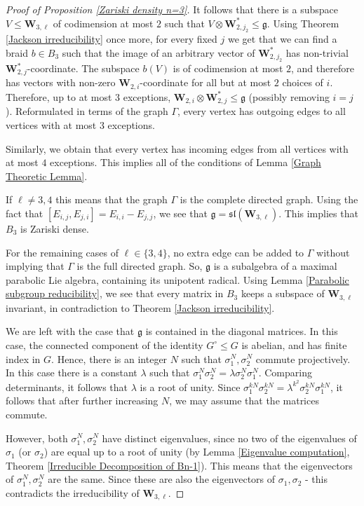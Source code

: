 \documentclass[letterpaper]{amsart}
\begin{document}
\begin{proof}[Proof of Proposition \ref{Zariski density n=3}]
    It follows that there is a subspace $V \leq \textbf{W}_{3, \ell}$ of codimension at most $2$ such that $V \otimes \textbf{W}_{2, j_2}^\ast \leq \mathfrak{g}$. Using Theorem \ref{Jackson irreducibility} once more, for every fixed $j$ we get that we can find a braid $b \in B_3$ such that the image of an arbitrary vector of $\textbf{W}_{2, j_2}^\ast$ has non-trivial $\textbf{W}_{2, j}^\ast$-coordinate. The subspace $b(V)$ is of codimension at most $2$, and therefore has vectors with non-zero $\textbf{W}_{2, i}$-coordinate for all but at most $2$ choices of $i$. Therefore, up to at most $3$ exceptions, $\textbf{W}_{2, i} \otimes \textbf{W}_{2, j}^\ast \leq \mathfrak{g}$ (possibly removing $i = j$). Reformulated in terms of the graph $\Gamma$, every vertex has outgoing edges to all vertices with at most $3$ exceptions.

    Similarly, we obtain that every vertex has incoming edges from all vertices with at most $4$ exceptions. This implies all of the conditions of Lemma \ref{Graph Theoretic Lemma}.

    If $\ell \neq 3,4$ this means that the graph $\Gamma$ is the complete directed graph. Using the fact that $[E_{i,j}, E_{j, i}] = E_{i, i} - E_{j, j}$, we see that $\mathfrak{g} = \mathfrak{sl}(\textbf{W}_{3, \ell}).$ This implies that $B_3$ is Zariski dense.

    For the remaining cases of $\ell \in \{3, 4\}$, no extra edge can be added to $\Gamma$ without implying that $\Gamma$ is the full directed graph. So, $\mathfrak{g}$ is a subalgebra of a maximal parabolic Lie algebra, containing its unipotent radical. Using Lemma \ref{Parabolic subgroup reducibility}, we see that every matrix in $B_3$ keeps a subspace of $\textbf{W}_{3, \ell}$ invariant, in contradiction to Theorem \ref{Jackson irreducibility}.

    We are left with the case that $\mathfrak{g}$ is contained in the diagonal matrices. In this case, the connected component of the identity $G^\circ \leq G$ is abelian, and has finite index in $G$. Hence, there is an integer $N$ such that $\sigma_1^N, \sigma_2^N$ commute projectively. In this case there is a constant $\lambda$ such that $\sigma_1^N \sigma_2^N = \lambda \sigma_2^N \sigma_1^N.$ Comparing determinants, it follows that $\lambda$ is a root of unity. Since $\sigma_1^{kN}\sigma_2^{kN}=\lambda^{k^2}\sigma_2^{kN}\sigma_1^{kN}$, it follows that after further increasing $N$, we may assume that the matrices commute.

    However, both $\sigma_1^N,\sigma_2^N$ have distinct eigenvalues, since no two of the eigenvalues of $\sigma_1$ (or $\sigma_2$) are equal up to a root of unity (by Lemma \ref{Eigenvalue computation}, Theorem \ref{Irreducible Decomposition of Bn-1}). This means that the eigenvectors of $\sigma_1^N, \sigma_2^N$ are the same. Since these are also the eigenvectors of $\sigma_1, \sigma_2$ - this contradicts the irreducibility of $\textbf{W}_{3,\ell}$.
\end{proof}
\end{document}
